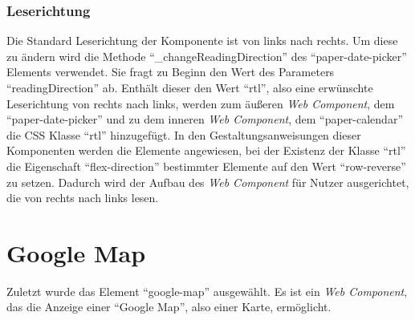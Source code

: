 \documentclass[12pt, paper=a4, bibtotoc, toc=listof, headsepline=true, numbers=endperiod]{scrreprt}
\begin{document}
		\subsubsection{Leserichtung}
		Die Standard Leserichtung der Komponente ist von links nach rechts. Um diese zu ändern wird die Methode \enquote{\_changeReadingDirection} des \enquote{paper-date-picker} Elements verwendet. Sie fragt zu Beginn den Wert des Parameters \enquote{readingDirection} ab. Enthält dieser den Wert \enquote{rtl}, also eine erwünschte Leserichtung von rechts nach links, werden zum äußeren \emph{Web Component}, dem \enquote{paper-date-picker} und zu dem inneren \emph{Web Component}, dem \enquote{paper-calendar} die \ac{CSS} Klasse \enquote{rtl} hinzugefügt. In den Gestaltungsanweisungen dieser Komponenten werden die Elemente angewiesen, bei der Existenz der Klasse \enquote{rtl} die Eigenschaft \enquote{flex-direction} bestimmter Elemente auf den Wert \enquote{row-reverse} zu setzen. Dadurch wird der Aufbau des \emph{Web Component} für Nutzer ausgerichtet, die von rechts nach links lesen.
		\newpage
	
	\section{Google Map}
	Zuletzt wurde das Element \enquote{google-map} ausgewählt. Es ist ein \emph{Web Component}, das die Anzeige einer \enquote{Google Map}, also einer Karte, ermöglicht\cite{gooMap}.
\end{document}
